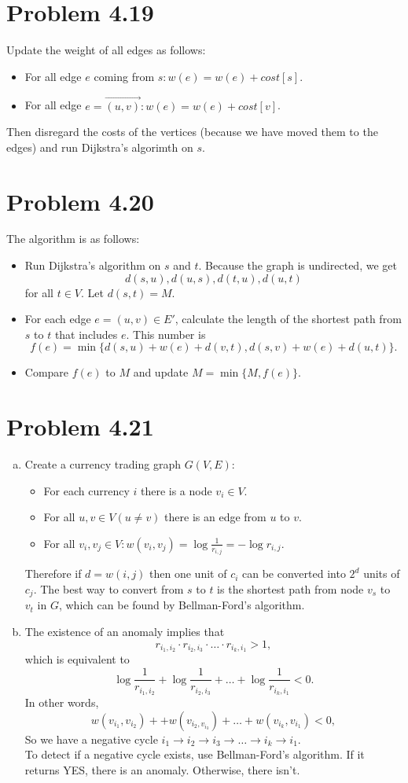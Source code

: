 \documentclass[12pt]{report}
\begin{document}
\section{Problem 4.19}
Update the weight of all edges as follows:
\begin{itemize}
  \item For all edge $e$ coming from $s: w(e) = w(e) + cost[s]$.
  \item For all edge $e = \overrightarrow{(u,v)}: w(e) = w(e) + cost[v]$.
\end{itemize}
Then disregard the costs of the vertices (because we have moved them to the edges) and run Dijkstra's algorimth on $s$.

\section{Problem 4.20}
The algorithm is as follows:
\begin{itemize}
  \item Run Dijkstra's algorithm on $s$ and $t$. Because the graph is undirected, we get $$d(s,u), d(u,s), d(t,u), d(u,t)$$ for all $t \in V$. Let $d(s,t) = M$.
  \item For each edge $e = (u,v) \in E'$, calculate the length of the shortest path from $s$ to $t$ that includes $e$. This number is $$f(e) = \min \{ d(s,u) + w(e) + d(v,t), d(s,v) + w(e) + d(u,t) \}.$$
  \item Compare $f(e)$ to $M$ and update $M = \min \{ M, f(e) \}$.
\end{itemize}

\section{Problem 4.21}
\begin{enumerate}[(a)]
\item Create a currency trading graph $G(V,E)$:
\begin{itemize}
  \item For each currency $i$ there is a node $v_i \in V$.
  \item For all $u, v \in V (u \ne v)$ there is an edge from $u$ to $v$.
  \item For all $v_i, v_j \in V: w(v_i, v_j) = \log \frac{1}{r_{i,j}} = - \log r_{i,j}$.
\end{itemize}
Therefore if $d = w(i,j)$ then one unit of $c_i$ can be converted into $2^d$ units of $c_j$.
The best way to convert from $s$ to $t$ is the shortest path from node $v_s$ to $v_t$ in $G$, which can be found by Bellman-Ford's algorithm.

\item
The existence of an anomaly implies that $$r_{i_1, i_2} \cdot r_{i_2, i_3} \cdot \ldots \cdot r_{i_k, i_1} > 1,$$
which is equivalent to $$\log \frac{1}{r_{i_1, i_2}} +  \log \frac{1}{r_{i_2, i_3}} +  \ldots + \log \frac{1}{r_{i_k, i_1}} < 0.$$
In other words, $$w(v_{i_1}, v_{i_2}) + + w(v_{i_2, v_{i_3}}) + \ldots + w(v_{i_k}, v_{i_1}) < 0,$$
So we have a negative cycle $i_1 \to i_2 \to i_3 \to \ldots \to i_k \to i_1.$ \\
To detect if a negative cycle exists, use Bellman-Ford's algorithm. If it returns YES, there is an anomaly. Otherwise, there isn't.
\end{enumerate}
\end{document}
